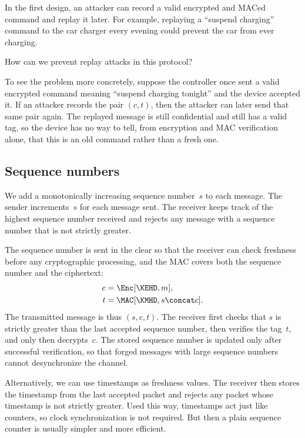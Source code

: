 In the first design, an attacker can record a valid encrypted and MACed
command and replay it later.
For example, replaying a \enquote{suspend charging} command to the car
charger every evening could prevent the car from ever charging.

\begin{exercise}
  How can we prevent replay attacks in this protocol?
\end{exercise}

To see the problem more concretely, suppose the controller once sent a valid
encrypted command meaning \enquote{suspend charging tonight} and the device
accepted it.
If an attacker records the pair \((c, t)\), then the attacker can later send
that same pair again.
The replayed message is still confidential and still has a valid tag, so the
device has no way to tell, from encryption and MAC verification alone, that
this is an old command rather than a fresh one.

\subsection{Sequence numbers}

We add a monotonically increasing sequence number~\(s\) to each message.
The sender increments~\(s\) for each message sent.
The receiver keeps track of the highest sequence number received and rejects
any message with a sequence number that is not strictly greater.

The sequence number is sent in the clear so that the receiver can check
freshness before any cryptographic processing, and the MAC covers both the
sequence number and the ciphertext:
\begin{align*}
  c &= \Enc[\KEHD, m], \\
  t &= \MAC[\KMHD, s \concat c].
\end{align*}
The transmitted message is thus \((s, c, t)\).
The receiver first checks that \(s\) is strictly greater than the last
accepted sequence number, then verifies the tag~\(t\), and only then
decrypts~\(c\).
The stored sequence number is updated only after successful verification,
so that forged messages with large sequence numbers cannot desynchronize
the channel.

Alternatively, we can use timestamps as freshness values.
The receiver then stores the timestamp from the last accepted packet and
rejects any packet whose timestamp is not strictly greater.
Used this way, timestamps act just like counters, so clock synchronization is
not required.
But then a plain sequence counter is usually simpler and more efficient.

